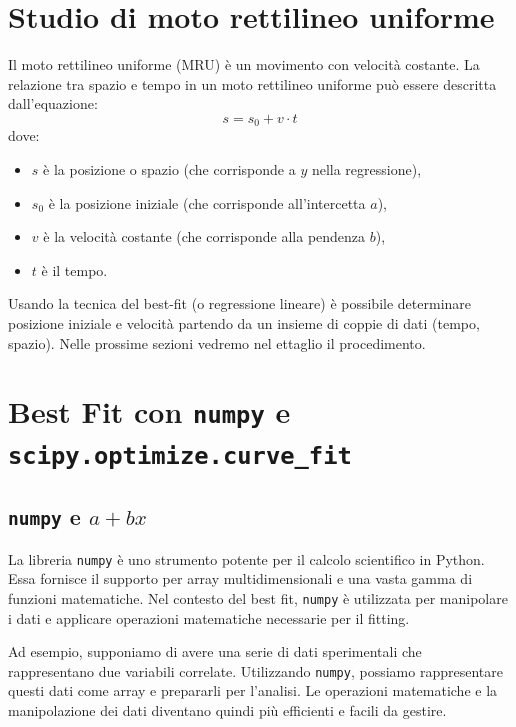 \documentclass[a4paper,12pt]{article}
\begin{document}
\section{Studio di moto rettilineo uniforme}
Il moto rettilineo uniforme (MRU) è un movimento con velocità costante. La relazione tra spazio e tempo in un moto rettilineo uniforme può essere descritta dall'equazione:
\[
s = s_0 + v \cdot t
\]
dove:
\begin{itemize}
    \item \( s \) è la posizione o spazio (che corrisponde a \( y \) nella regressione),
    \item \( s_0 \) è la posizione iniziale (che corrisponde all'intercetta \( a \)),
    \item \( v \) è la velocità costante (che corrisponde alla pendenza \( b \)),
    \item \( t \) è il tempo.
\end{itemize}
Usando la tecnica del best-fit (o regressione lineare) è possibile determinare posizione iniziale e velocità partendo da un insieme di coppie di dati (tempo, spazio). Nelle prossime sezioni vedremo nel ettaglio il procedimento.




\section{\texorpdfstring{Best Fit con \texttt{numpy} e \texttt{scipy.optimize.curve\_fit}}{Best Fit con numpy e scipy.optimize.curve_fit}}

\subsection{\texorpdfstring{\texttt{numpy} e $a + b x$}{numpy e a + b x}}

La libreria \texttt{numpy} è uno strumento potente per il calcolo scientifico in Python. Essa fornisce il supporto per array multidimensionali e una vasta gamma di funzioni matematiche. Nel contesto del best fit, \texttt{numpy} è utilizzata per manipolare i dati e applicare operazioni matematiche necessarie per il fitting.

Ad esempio, supponiamo di avere una serie di dati sperimentali che rappresentano due variabili correlate. Utilizzando \texttt{numpy}, possiamo rappresentare questi dati come array e prepararli per l'analisi. Le operazioni matematiche e la manipolazione dei dati diventano quindi più efficienti e facili da gestire.
\end{document}
